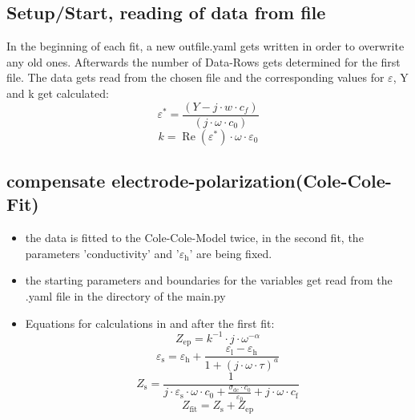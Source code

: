\documentclass[10pt,a4paper]{article}
\renewcommand{\*}{\cdot}
\begin{document}
\subsection{Setup/Start, reading of data from file}{
In the beginning of each fit, a new outfile.yaml gets written in order to overwrite any old ones. Afterwards the number of Data-Rows gets determined for the first file. The data gets read from the chosen file and the corresponding values for $\varepsilon$, Y and k get calculated: 
\begin{equation}
\varepsilon^\ast = \frac{(Y-j\*w\*c_f)}{(j\*\omega\*c_0)} 
\end{equation}
\begin{equation}
k = \operatorname{Re}(\varepsilon^\ast) \* \omega \* \varepsilon_{\mathrm{0}}
\end{equation}
}
\subsection{compensate electrode-polarization(Cole-Cole-Fit)}
\begin{itemize}
\item the data is fitted to the Cole-Cole-Model twice, in the second fit, the parameters 'conductivity' and '$\varepsilon_\mathrm{h}$' are being fixed. 
\item the starting parameters and boundaries for the variables get read from the .yaml file in the directory of the main.py
\item Equations for calculations in and after the first fit: 
\begin{equation}
Z_\mathrm{ep} = k^{-1} \* j\*\omega^{-\alpha}
\end{equation}
\begin{equation}
\varepsilon_\mathrm{s} = \varepsilon_\mathrm{h} + \frac{\varepsilon_\mathrm{l}-\varepsilon_\mathrm{h}}{1+(j\*\omega\*\tau)^a}
\end{equation}
\begin{equation}
Z_\mathrm{s} = \frac{1}{j\*\varepsilon_\mathrm{s}\*\omega\*c_\mathrm{0} + \frac{\sigma_\mathrm{dc}\*c_\mathrm{0}}{\varepsilon_\mathrm{0}} + j\*\omega\*c_\mathrm{f}}
\end{equation}
\begin{equation}
Z_\mathrm{fit} = Z_\mathrm{s} + Z_\mathrm{ep}
\end{equation}
\end{itemize}
\end{document}
